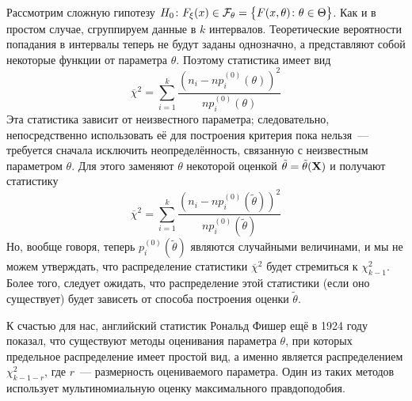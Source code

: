 Рассмотрим сложную гипотезу $H_0\colon F_{\xi}(x) \in \mathcal{F}_{\theta} = \bigl\{ F(x, \theta)\colon \theta \in \Theta\bigr\}$.
Как и в простом случае, сгруппируем данные в $k$ интервалов. 
Теоретические вероятности попадания в интервалы теперь не будут заданы однозначно, а представляют собой некоторые функции от параметра $\theta$.
Поэтому статистика имеет вид 
\begin{equation*}
    \overline{\chi}^{2} = \sum\limits_{i = 1}^{k} \frac{\left(n_i - n p_{i}^{(0)}(\theta)\right)^2}{n p_{i}^{(0)}(\theta)}
\end{equation*}
Эта статистика зависит от неизвестного параметра; следовательно, непосредственно использовать её для построения критерия пока нельзя~---
требуется сначала исключить неопределённость, связанную с неизвестным параметром $\theta$.
Для этого заменяют $\theta$ некоторой оценкой $\tilde{\theta} = \tilde{\theta}(\mathbf{X})$ и получают статистику
\begin{equation*}
    \overline{\chi}^{2} = \sum\limits_{i = 1}^{k} \frac{\left(n_i - n p_{i}^{(0)}(\tilde{\theta}) \right)^2}{n p_{i}^{(0)}(\tilde{\theta})}
\end{equation*}
Но, вообще говоря, теперь $p_{i}^{(0)}(\tilde{\theta})$ являются случайными величинами, и мы не можем утверждать, что распределение статистики $\overline{\chi}^{2}$ будет стремиться к $\chi^{2}_{k-1}$.
Более того, следует ожидать, что распределение этой статистики (если оно существует) будет зависеть от способа построения оценки $\tilde{\theta}$.

К счастью для нас, английский статистик Рональд Фишер ещё в 1924 году показал, что существуют методы оценивания параметра $\theta$, 
при которых предельное распределение имеет простой вид, а именно является распределением $\chi^{2}_{k - 1 - r}$, где $r$~--- размерность оцениваемого параметра.
Один из таких методов использует мультиномиальную оценку максимального правдоподобия.


